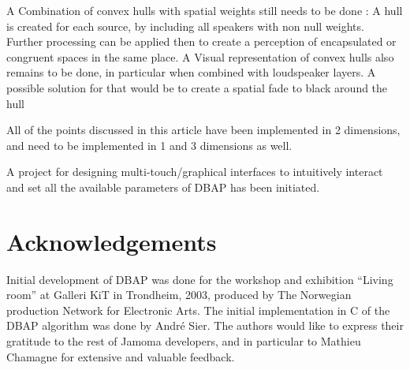 \documentclass[twoside,10pt]{article}
\begin{document}
A Combination of convex hulls with spatial weights still needs to be done : A hull is created for each source, by including all speakers with non null weights. Further processing can be applied then to create a perception of encapsulated or congruent spaces in the same place.
A Visual representation of convex hulls also remains to be done, in particular when combined with loudspeaker layers. A possible solution for that would be to create a spatial fade to black around the hull 

All of the points discussed in this article have been implemented in 2 dimensions, and need to be implemented in 1 and 3 dimensions as well.  

A project for designing multi-touch/graphical interfaces to intuitively interact and set all the available parameters of DBAP has been initiated.

\section{Acknowledgements}

Initial development of DBAP was done for the workshop and exhibition ``Living room'' at Galleri KiT in Trondheim, 2003, produced by The Norwegian production Network for Electronic Arts. The initial implementation in C of the DBAP algorithm was done by André Sier. The authors would like to express their gratitude to the rest of Jamoma developers, and in particular to Mathieu Chamagne for extensive and valuable feedback. 




\end{document}
